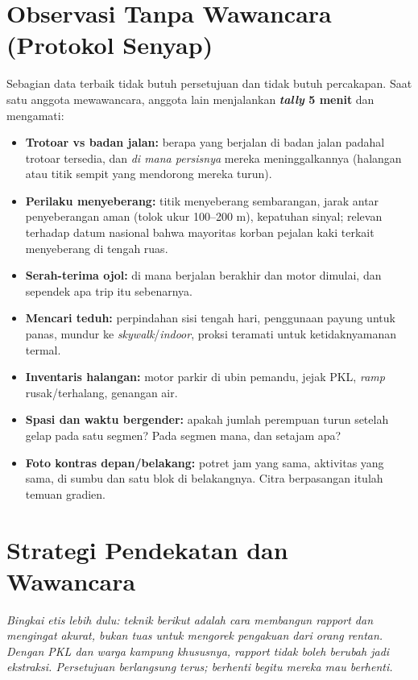 \documentclass[11pt,a4paper]{report}
\begin{document}
\chapter{Observasi Tanpa Wawancara (Protokol Senyap)}
Sebagian data terbaik tidak butuh persetujuan dan tidak butuh percakapan. Saat satu
anggota mewawancara, anggota lain menjalankan \textbf{\emph{tally} 5 menit} dan
mengamati:
\begin{itemize}
  \item \textbf{Trotoar vs badan jalan:} berapa yang berjalan di badan jalan padahal
    trotoar tersedia, dan \emph{di mana persisnya} mereka meninggalkannya (halangan atau
    titik sempit yang mendorong mereka turun).
  \item \textbf{Perilaku menyeberang:} titik menyeberang sembarangan, jarak antar
    penyeberangan aman (tolok ukur 100--200 m), kepatuhan sinyal; relevan terhadap datum
    nasional bahwa mayoritas korban pejalan kaki terkait menyeberang di tengah ruas.
  \item \textbf{Serah-terima ojol:} di mana berjalan berakhir dan motor dimulai, dan
    sependek apa trip itu sebenarnya.
  \item \textbf{Mencari teduh:} perpindahan sisi tengah hari, penggunaan payung untuk
    panas, mundur ke \emph{skywalk}/\emph{indoor}, proksi teramati untuk ketidaknyamanan
    termal.
  \item \textbf{Inventaris halangan:} motor parkir di ubin pemandu, jejak PKL, \emph{ramp}
    rusak/terhalang, genangan air.
  \item \textbf{Spasi dan waktu bergender:} apakah jumlah perempuan turun setelah gelap
    pada satu segmen? Pada segmen mana, dan setajam apa?
  \item \textbf{Foto kontras depan/belakang:} potret jam yang sama, aktivitas yang sama,
    di sumbu dan satu blok di belakangnya. Citra berpasangan itulah temuan gradien.
\end{itemize}

\chapter{Strategi Pendekatan dan Wawancara}
\emph{Bingkai etis lebih dulu: teknik berikut adalah cara membangun \emph{rapport} dan
mengingat akurat, bukan tuas untuk mengorek pengakuan dari orang rentan. Dengan PKL dan
warga kampung khususnya, \emph{rapport} tidak boleh berubah jadi ekstraksi. Persetujuan
berlangsung terus; berhenti begitu mereka mau berhenti.}
\end{document}
